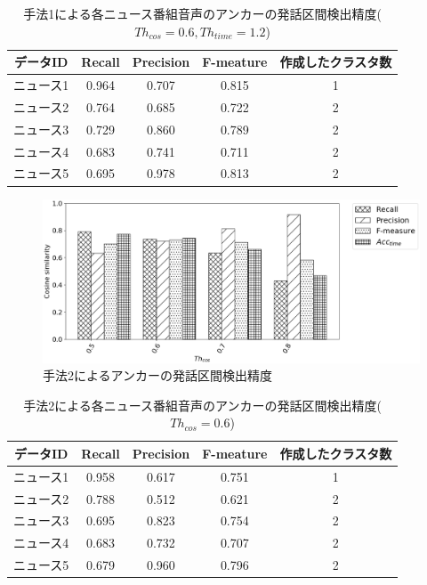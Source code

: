 {\begin{table}[H]
  \begin{center}
    \caption{手法1による各ニュース番組音声のアンカーの発話区間検出精度($Th_{cos}=0.6,Th_{time}=1.2$) }
    \begin{tabular}{|c||c|c|c|c|} \hline
データID & Recall & Precision & F-meature & 作成したクラスタ数\\ \hline
ニュース1 & 0.964 & 0.707 & 0.815 & 1 \\ \hline
ニュース2 & 0.764 & 0.685 & 0.722 & 2 \\ \hline
ニュース3 & 0.729 & 0.860 & 0.789 & 2 \\ \hline
ニュース4 & 0.683 & 0.741 & 0.711 & 2 \\ \hline
ニュース5 & 0.695 & 0.978 & 0.813 & 2 \\ \hline
    \end{tabular}
  \end{center}
\end{table}

\begin{figure}[H]
  \begin{center}
    \includegraphics[scale=0.5]{./figure/prob2.eps}
  \end{center}
  \caption{手法2によるアンカーの発話区間検出精度 \label{fig:result_anchor_prob2}}
\end{figure}

\begin{table}[H]
  \begin{center}
    \caption{手法2による各ニュース番組音声のアンカーの発話区間検出精度($Th_{cos}=0.6$) }
    \begin{tabular}{|c||c|c|c|c|} \hline
データID & Recall & Precision & F-meature & 作成したクラスタ数\\ \hline
ニュース1 & 0.958 & 0.617 & 0.751 & 1 \\ \hline
ニュース2 & 0.788 & 0.512 & 0.621 & 2 \\ \hline
ニュース3 & 0.695 & 0.823 & 0.754 & 2 \\ \hline
ニュース4 & 0.683 & 0.732 & 0.707 & 2 \\ \hline
ニュース5 & 0.679 & 0.960 & 0.796 & 2 \\ \hline
    \end{tabular}
  \end{center}
\end{table}

}
